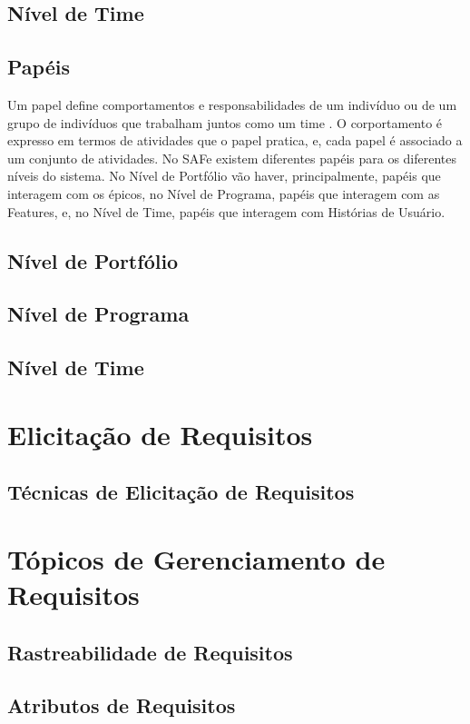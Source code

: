 \section{Nível de Time}

\section{Papéis}
Um papel define comportamentos e responsabilidades de um indivíduo ou de um grupo de indivíduos que trabalham juntos como um time \cite{kruchten002}. O corportamento é expresso em termos de atividades que o papel pratica, e, cada papel é associado a um conjunto de atividades. No SAFe existem diferentes papéis para os diferentes níveis do sistema. No Nível de Portfólio vão haver, principalmente, papéis que interagem com os épicos, no Nível de Programa, papéis que interagem com as Features, e, no Nível de Time, papéis que interagem com Histórias de Usuário.
\section{Nível de Portfólio}
\section{Nível de Programa}
\section{Nível de Time}

\chapter[Elicitação de Requisitos]{Elicitação de Requisitos}
\section{Técnicas de Elicitação de Requisitos}

\chapter[Tópicos de Gerenciamento de Requisitos]{Tópicos de Gerenciamento de Requisitos}
\section{Rastreabilidade de Requisitos}
\section{Atributos de Requisitos}

